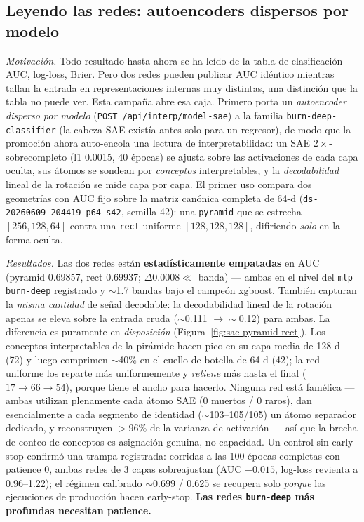 \documentclass[11pt]{article}
\newcommand{\dsid}[1]{\texttt{\small #1}}
\begin{document}
\subsection{Leyendo las redes: autoencoders dispersos por modelo}
\label{sec:anns-sae}
\emph{Motivación.} Todo resultado hasta ahora se ha leído de la tabla de
clasificación --- AUC, log-loss, Brier. Pero dos redes pueden publicar AUC
idéntico mientras tallan la entrada en representaciones internas muy distintas,
una distinción que la tabla no puede ver. Esta campaña abre esa caja. Primero
porta un \emph{autoencoder disperso por modelo} (\texttt{POST
/api/interp/model-sae}) a la familia \texttt{burn-deep-classifier} (la cabeza SAE
existía antes solo para un regresor), de modo que la promoción ahora auto-encola
una lectura de interpretabilidad: un SAE $2\times$-sobrecompleto (l1 \num{0.0015},
40 épocas) se ajusta sobre las activaciones de cada capa oculta, sus átomos se
sondean por \emph{conceptos} interpretables, y la \emph{decodabilidad} lineal de
la rotación se mide capa por capa. El primer uso compara dos geometrías con AUC
fijo sobre la matriz canónica completa de 64-d (\dsid{ds-20260609-204419-p64-s42},
semilla 42): una \texttt{pyramid} que se estrecha $[256,128,64]$ contra una
\texttt{rect} uniforme $[128,128,128]$, difiriendo \emph{solo} en la forma oculta.

\emph{Resultados.} Las dos redes están \textbf{estadísticamente empatadas} en AUC
(pyramid \num{0.69857}, rect \num{0.69937}; $\Delta\num{0.0008}\ll$ banda) ---
ambas en el nivel del \texttt{mlp} \texttt{burn-deep} registrado y $\sim$1.7 bandas
bajo el campeón xgboost. También capturan la \emph{misma cantidad} de señal
decodable: la decodabilidad lineal de la rotación apenas se eleva sobre la entrada
cruda ($\sim$0.111 $\to\sim$0.12) para ambas. La diferencia es puramente en
\emph{disposición} (Figura~\ref{fig:sae-pyramid-rect}). Los conceptos
interpretables de la pirámide hacen pico en su capa media de 128-d (72) y luego
comprimen $\sim$40\% en el cuello de botella de 64-d (42); la red uniforme los
reparte más uniformemente y \emph{retiene} más hasta el final ($17\to66\to54$),
porque tiene el ancho para hacerlo. Ninguna red está famélica --- ambas utilizan
plenamente cada átomo SAE (0 muertos / 0 raros), dan esencialmente a cada segmento
de identidad ($\sim$103--105/105) un átomo separador dedicado, y reconstruyen
$>96\%$ de la varianza de activación --- así que la brecha de conteo-de-conceptos
es asignación genuina, no capacidad. Un control sin early-stop confirmó una trampa
registrada: corridas a las 100 épocas completas con patience 0, ambas redes de
3 capas sobreajustan (AUC $-\num{0.015}$, log-loss revienta a \num{0.96}--\num{1.22});
el régimen calibrado $\sim$0.699 / 0.625 se recupera solo \emph{porque} las
ejecuciones de producción hacen early-stop. \textbf{Las redes \texttt{burn-deep}
más profundas necesitan patience.}
\end{document}
